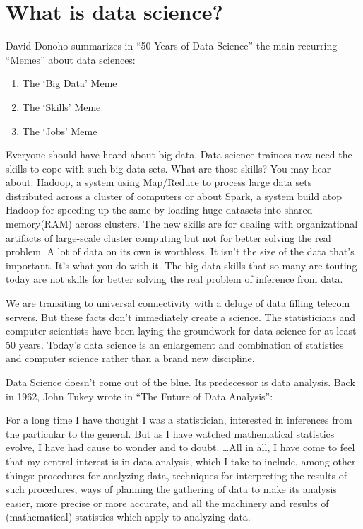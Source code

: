 \documentclass[12pt,]{krantz}
\providecommand{\tightlist}{%
  \setlength{\itemsep}{0pt}\setlength{\parskip}{0pt}}
\renewenvironment{quote}{\begin{VF}}{\end{VF}}
\theoremstyle{definition}
\theoremstyle{definition}
\theoremstyle{definition}
\theoremstyle{remark}
\begin{document}
\section{What is data science?}\label{what-is-data-science}

David Donoho \citep{data50} summarizes in ``50 Years of Data Science''
the main recurring ``Memes'' about data sciences:

\begin{enumerate}
\def\labelenumi{\arabic{enumi}.}
\tightlist
\item
  The `Big Data' Meme
\item
  The `Skills' Meme
\item
  The `Jobs' Meme
\end{enumerate}

Everyone should have heard about big data. Data science trainees now
need the skills to cope with such big data sets. What are those skills?
You may hear about: Hadoop, a system using Map/Reduce to process large
data sets distributed across a cluster of computers or about Spark, a
system build atop Hadoop for speeding up the same by loading huge
datasets into shared memory(RAM) across clusters. The new skills are for
dealing with organizational artifacts of large-scale cluster computing
but not for better solving the real problem. A lot of data on its own is
worthless. It isn't the size of the data that's important. It's what you
do with it. The big data skills that so many are touting today are not
skills for better solving the real problem of inference from data.

We are transiting to universal connectivity with a deluge of data
filling telecom servers. But these facts don't immediately create a
science. The statisticians and computer scientists have been laying the
groundwork for data science for at least 50 years. Today's data science
is an enlargement and combination of statistics and computer science
rather than a brand new discipline.

Data Science doesn't come out of the blue. Its predecessor is data
analysis. Back in 1962, John Tukey wrote in ``The Future of Data
Analysis'':

\begin{quote}
For a long time I have thought I was a statistician, interested in
inferences from the particular to the general. But as I have watched
mathematical statistics evolve, I have had cause to wonder and to doubt.
\ldots{}All in all, I have come to feel that my central interest is in
data analysis, which I take to include, among other things: procedures
for analyzing data, techniques for interpreting the results of such
procedures, ways of planning the gathering of data to make its analysis
easier, more precise or more accurate, and all the machinery and results
of (mathematical) statistics which apply to analyzing data.
\end{quote}
\end{document}
